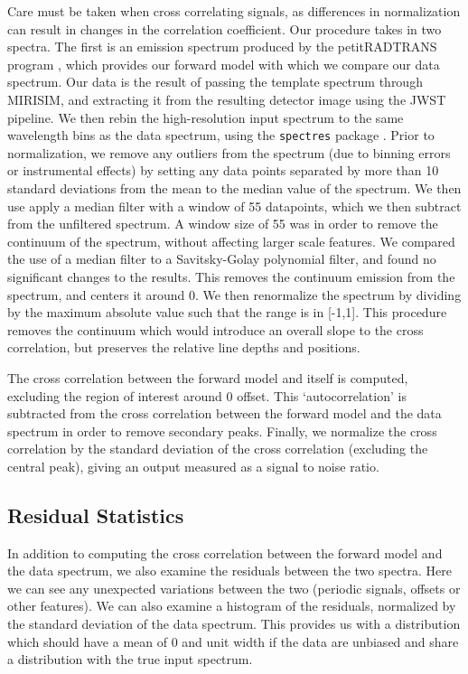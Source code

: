 Care must be taken when cross correlating signals, as differences in normalization can result in changes in the correlation coefficient. 
Our procedure takes in two spectra. 
The first is an emission spectrum produced by the petitRADTRANS program \parencite{Molliere2019}, which provides our forward model with which we compare our data spectrum.
Our data is the result of passing the template spectrum through MIRISIM, and extracting it from the resulting detector image using the JWST pipeline.
We then rebin the high-resolution input spectrum to the same wavelength bins as the data spectrum, using the \verb|spectres| package \parencite{Carnall2017}.
Prior to normalization, we remove any outliers from the spectrum (due to binning errors or instrumental effects) by setting any data points separated by more than 10 standard deviations from the mean to the median value of the spectrum.
We then use apply a median filter with a window of 55 datapoints, which we then subtract from the unfiltered spectrum. 
A window size of 55 was in order to remove the continuum of the spectrum, without affecting larger scale features.
We compared the use of a median filter to a Savitsky-Golay polynomial filter, and found no significant changes to the results.
This removes the continuum emission from the spectrum, and centers it around 0.
We then renormalize the spectrum by dividing by the maximum absolute value such that the range is in [-1,1]. 
This procedure removes the continuum which would introduce an overall slope to the cross correlation, but preserves the relative line depths and positions.

The cross correlation between the forward model and itself is computed, excluding the region of interest around 0 offset. 
This `autocorrelation' is subtracted from the cross correlation between the forward model and the data spectrum in order to remove secondary peaks.
Finally, we normalize the cross correlation by the standard deviation of the cross correlation (excluding the central peak), giving an output measured as a signal to noise ratio.

\subsection{Residual Statistics}
In addition to computing the cross correlation between the forward model and the data spectrum, we also examine the residuals between the two spectra.
Here we can see any unexpected variations between the two (periodic signals, offsets or other features).
We can also examine a histogram of the residuals, normalized by the standard deviation of the data spectrum.
This provides us with a  distribution which should have a mean of 0 and unit width if the data are unbiased and share a distribution with the true input spectrum.

